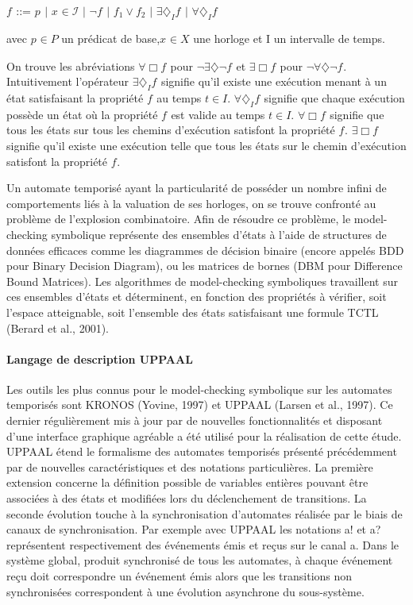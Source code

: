 \documentclass[french]{spimufcphdthesis}
\begin{document}
\centerline{$f_{ }$ ::= $p_{ }$ $|$ $x_{ } \in \mathcal{I}$ $|$ $\neg f_{ }$ $|$ $f_{1} \vee f_{2}$ $|$ $\exists \diamondsuit_{I} f_{ } $ $|$ $\forall \diamondsuit_{I} f_{ } $}
avec $p_{ } \in P$ un prédicat de base,$x_{ } \in X $  une horloge et I un intervalle de temps.

On trouve les abréviations $\forall \Box f_{ }$ pour $\neg \exists \diamondsuit \neg f_{ }$ et $\exists \Box f_{ }$ pour $\neg \forall \diamondsuit \neg f_{ }$. Intuitivement
l’opérateur $\exists \diamondsuit_{I} f_{ }$ signifie qu’il existe une exécution menant à un état satisfaisant la
propriété $f_{ }$ au temps $t \in I$.
$\forall \diamondsuit_{I} f_{ }$ signifie que chaque exécution possède un état où la propriété $f_{ }$ est valide au temps $t \in I$.
$\forall \Box f_{ }$ signifie que tous les états sur tous les
chemins d’exécution satisfont la propriété $f_{ }$.
$\exists \Box f_{ } $ signifie qu’il existe une exécution
telle que tous les états sur le chemin d’exécution satisfont la propriété $f_{ }$.

Un automate temporisé ayant la particularité de posséder un nombre infini de comportements liés à la valuation de ses horloges, on se trouve confronté au problème
de l’explosion combinatoire. Afin de résoudre ce problème, le model-checking symbolique représente des ensembles d’états à l’aide de structures de données efficaces
comme les diagrammes de décision binaire (encore appelés BDD pour Binary Decision Diagram), ou les matrices de bornes (DBM pour Difference Bound Matrices).
Les algorithmes de model-checking symboliques travaillent sur ces ensembles d’états et déterminent, en fonction des propriétés à vérifier, soit l’espace atteignable, soit l’ensemble des états satisfaisant une formule TCTL (Berard et al., 2001).

\paragraph{Langage de description UPPAAL}

 Les outils les plus connus pour le model-checking symbolique sur les automates temporisés sont KRONOS (Yovine, 1997) et UPPAAL (Larsen et al., 1997). Ce dernier régulièrement mis à jour par de nouvelles fonctionnalités et disposant d’une interface graphique agréable a été utilisé pour la réalisation de cette étude. UPPAAL étend le formalisme des automates temporisés présenté précédemment par de nouvelles caractéristiques et des notations particulières. La première extension concerne la définition possible de variables entières pouvant être associées à des états et modifiées lors du déclenchement de transitions. La seconde évolution touche à la synchronisation d’automates réalisée par le biais de canaux de synchronisation. Par exemple avec UPPAAL les notations a! et a? représentent respectivement des événements émis et reçus sur le canal a. Dans le système global, produit synchronisé de tous les automates, à chaque événement reçu doit correspondre un événement émis alors que les transitions
non synchronisées correspondent à une évolution asynchrone du sous-système.
\end{document}
